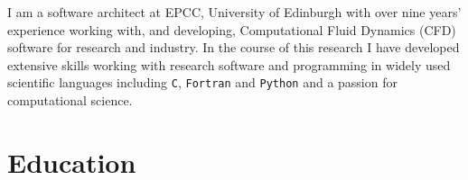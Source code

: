 \documentclass[10pt,a4paper]{moderncv} %
\begin{document}
\makecvtitle %
\vspace{-0.6cm}


I am a software architect at EPCC, University of Edinburgh with over nine years' experience
working with, and developing, Computational Fluid Dynamics (CFD) software for research and industry.
In the course of this research I have developed extensive skills working with research software and
programming in widely used scientific languages including \texttt{C}, \texttt{Fortran} and
\texttt{Python} and a passion for computational science.


\section{Education}
\end{document}
